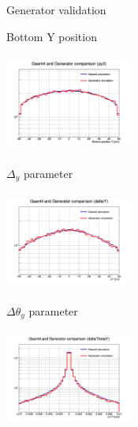 \documentclass[handout,8 pt]{beamer}
\begin{document}
\begin{frame}{Generator validation}
\begin{minipage}[c]{.32\textwidth}
\begin{exampleblock}{} \begin{center}Bottom Y position\end{center} \end{exampleblock}
\includegraphics[width=4.2cm, height=3.2cm]{figs/py2-17p2vs17p2.png} 
\end{minipage}
\begin{minipage}[c]{.32\textwidth}
\begin{exampleblock}{} \begin{center}$\Delta_y$ parameter\end{center} \end{exampleblock}
\includegraphics[width=4.2cm, height=3.2cm]{figs/deltaY-17p2vs17p2.png}
\end{minipage}
\begin{minipage}[c]{.32\textwidth}
\begin{exampleblock}{} \begin{center}$\Delta \theta_y$ parameter\end{center} \end{exampleblock}
\includegraphics[width=4.2cm, height=3.2cm]{figs/deltaThetaY-17p2vs17p2.png}
\end{minipage} \vfill
\end{frame}
\end{document}
